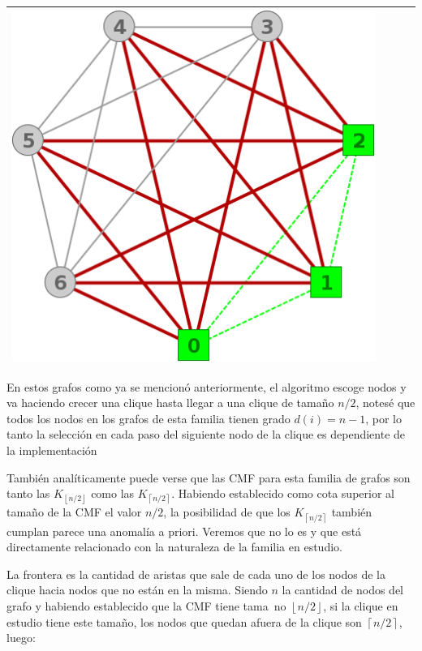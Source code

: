 \begin{center}
\begin{tabular}{ |c||c||c||c| }
			\includegraphics[scale = 0.25]{img/ej3/constructiva_golosa/K7_st3.png} \\
			\hline
		\end{tabular}
	\end{center}

	En estos grafos como ya se mencion\'o anteriormente, el algoritmo
	escoge nodos y va haciendo crecer una clique hasta llegar a una 
	clique de tama\~no $n/2$, notes\'e que todos los nodos en los 
	grafos de esta familia tienen grado $d(i) = n - 1$, por lo
	tanto la selecci\'on en cada paso del siguiente nodo de la
	clique es dependiente de la implementaci\'on

	Tambi\'en anal\'iticamente puede verse que las CMF para esta 
	familia de grafos son tanto las $K_{\left \lfloor{n/2}\right \rfloor}$ 
	como las $K_{\left \lceil{n/2}\right \rceil}$. Habiendo establecido como
	cota superior al tama\~no de la CMF el valor $n/2$, la posibilidad de que
	los $K_{\left \lceil{n/2}\right \rceil}$ tambi\'en cumplan parece una 
	anomal\'ia a priori. Veremos que no lo es y que est\'a directamente
	relacionado con la naturaleza de la familia en estudio. 

	La frontera es la cantidad de aristas que sale de cada uno de los
	nodos de la clique hacia nodos que no est\'an en la misma. Siendo
	$n$ la cantidad de nodos del grafo y habiendo establecido que la CMF
	tiene tama~no $\left \lfloor{n/2}\right \rfloor$, 
	si la clique en estudio tiene este tama\~no, los nodos que quedan afuera
	de la clique son $\left \lceil{n/2} \right \rceil$, luego: 

